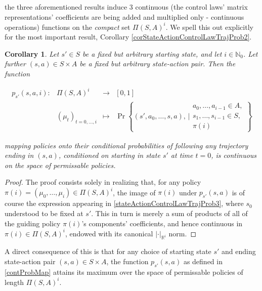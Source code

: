 \documentclass[11pt]{article} %
\newtheorem{cor}{Corollary}
\begin{document}
the three aforementioned results induce 3 continuous (the control laws' matrix representations' coefficients are being added and multiplied only - continuous operations) functions on the \textit{compact} set $\Pi(S,A)^i$. We spell this out explicitly for the most important result, Corollary \ref{corStateActionControlLawTrajProb2}.

\begin{cor}\label{corContProbMap}
	Let $s' \in S$ be a fixed but arbitrary starting state, and let $i \in \mathbb{N}_0$. Let further $(s,a) \in S \times A$ be a fixed but arbitrary state-action pair. Then the function

\begin{equation}\label{contProbMap}
	\begin{array}{rccl}
		p_{s'}(s,a,i): 	& \Pi(S,A)^i 			& \rightarrow 	& [0,1] \\
					& (\mu_t)_{t=0,\dots,i} 	& \mapsto 	& \Pr\left\{  (s',a_0,\dots,s,a), \, \Bigg| \begin{array}{lr}
																					a_0, \dots, a_{i-1} \in A, \\
																					s_1,\dots,s_{i-1} \in S, \\
																					\pi(i)
																					\end{array} \right\}
	\end{array}
\end{equation}

mapping policies onto their conditional probabilities of following \textit{any} trajectory ending in $(s,a)$, conditioned on starting in state $s'$ at time $t=0$, is continuous on the space of permissable policies.
\end{cor}

\begin{proof}
	The proof consists solely in realizing that, for any policy $\pi(i) = (\mu_0,\dots,\mu_i) \in \Pi(S,A)^i$, the image of $\pi(i)$ under $p_{s'}(s,a)$ is of course the expression appearing in \ref{stateActionControlLawTrajProb3}, where $s_0$ understood to be fixed at $s'$. This in turn is merely a sum of products of all of the guiding policy $\pi(i)$'s components' coefficients, and hence continuous in $\pi(i) \in \Pi(S,A)^i$, endowed with its canonical $| \cdot |_{\mathbb{R}^i}$ norm.
\end{proof}

A direct consequence of this is that for any choice of starting state $s'$ and ending state-action pair $(s,a) \in S \times A$, the function $p_{s'}(s,a)$ as defined in \ref{contProbMap} attains its maximum over the space of permissable policies of length $\Pi(S,A)^i$.
\end{document}

